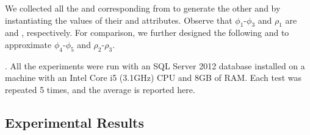 We collected all the  and corresponding  from \dblp to generate the other \pCFDs and \pCINDs by instantiating the values of their  and  attributes. Observe that $\phi_1$-$\phi_3$ and $\rho _1$ are \CFDs and \CINDs, respectively. For comparison,  we further designed the following \CFDs and \CINDs to approximate $\phi_4$-$\phi_5$ and $\rho_2$-$\rho_3$.

\begin{footnotesize}
\end{footnotesize}


. All the experiments were run with an SQL Server 2012 database installed on a machine with an Intel Core i5 (3.1GHz) CPU and 8GB of RAM. Each test was repeated 5 times, and the average is reported here.

\subsection{Experimental Results}

